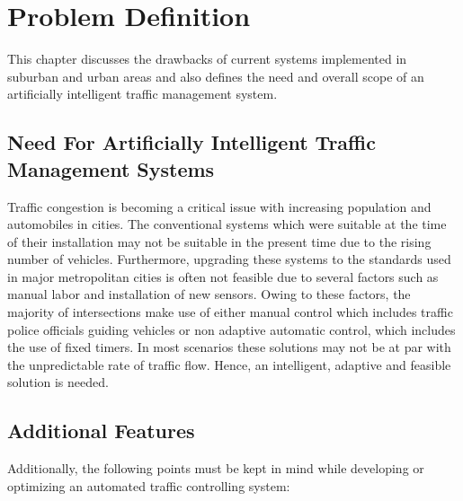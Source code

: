 \documentclass[openany,12pt]{report}
\begin{document}
	
	
	\chapter{Problem Definition}
	
	\hspace*{0.5in}This chapter discusses the drawbacks of current systems implemented in suburban and urban areas and also defines the need and overall scope of an artificially intelligent traffic management system.\\
	
	\section{Need For Artificially Intelligent Traffic Management Systems}
	\hspace*{0.5in}Traffic congestion is becoming a critical issue with increasing population and automobiles in cities. The conventional systems which were suitable at the time of their installation may not be suitable in the present time due to the rising number of vehicles. Furthermore, upgrading these systems to the standards used in major metropolitan cities is often not feasible due to several factors such as manual labor and installation of new sensors. Owing to these factors, the majority of intersections make use of either manual control which includes traffic police officials guiding vehicles or non adaptive automatic control, which includes the use of fixed timers. In most scenarios these solutions may not be at par with the unpredictable rate of traffic flow. Hence, an intelligent, adaptive and feasible solution is needed.\\
	
	\section{Additional Features}
	\hspace*{0.5in}Additionally, the following points must be kept in mind while developing or optimizing an automated traffic controlling system:\\
	
\end{document}
